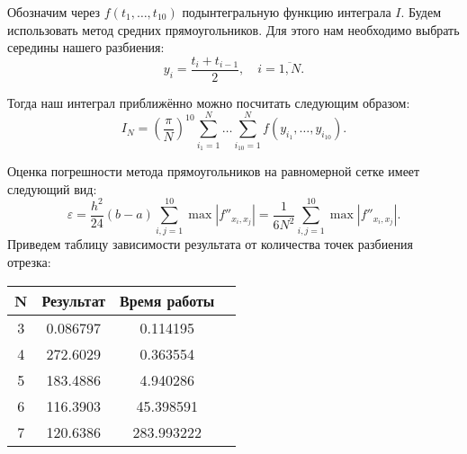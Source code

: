 Обозначим через \( f(t_1, \ldots, t_{10}) \) подынтегральную функцию интеграла
 \( I \). Будем использовать метод средних прямоугольников. Для этого нам
 необходимо выбрать середины нашего разбиения:
\[
y_i = \dfrac{t_i + t_{i - 1}}{2},\quad i = \overline{1,N}.
\]

Тогда наш интеграл приближённо можно посчитать следующим образом:
\[
I_N = \left( \dfrac{\pi}{N} \right)^{10} \sum\limits_{i_1 = 1}^N \ldots
 \sum\limits_{i_{10} = 1}^N f(y_{i_1}, \ldots, y_{i_{10}}).
\]


Оценка погрешности метода прямоугольников на равномерной сетке имеет следующий
 вид: 
$$
\varepsilon = \dfrac{h^2}{24} (b - a) \sum\limits_{i,j = 1}^{10} \max \left|
 f''_{x_i, x_j} \right| = \dfrac{1}{6N^2} \sum\limits_{i,j = 1}^{10} \max 
 \left|f''_{x_i,x_j} \right|.
$$
Приведем таблицу зависимости результата от количества точек разбиения отрезка:
\begin{center}
	\begin{tabular}{|c|c|c|c|}
		\hline
		N & Результат & Время работы\\\hline
		3&0.086797&0.114195\\\hline
		4&272.6029&0.363554\\\hline
		5&183.4886&4.940286\\\hline
		6&116.3903&45.398591\\\hline
		7&120.6386&283.993222\\\hline
	\end{tabular}
\end{center}